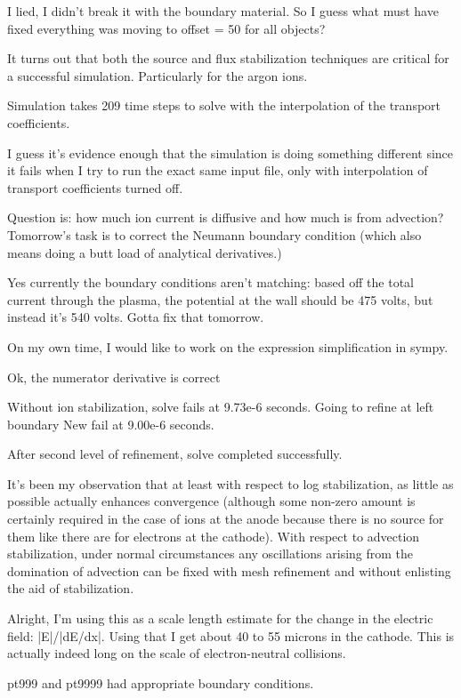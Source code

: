 {I lied, I didn't break it with the boundary material. So I guess what must have fixed everything was moving to offset = 50 for all objects?

It turns out that both the source and flux stabilization techniques are critical for a successful simulation. Particularly for the argon ions.

Simulation takes 209 time steps to solve with the interpolation of the transport coefficients.

I guess it's evidence enough that the simulation is doing something different since it fails when I try to run the exact same input file, only with interpolation of transport coefficients turned off.

Question is: how much ion current is diffusive and how much is from advection? Tomorrow's task is to correct the Neumann boundary condition (which also means doing a butt load of analytical derivatives.)

Yes currently the boundary conditions aren't matching: based off the total current through the plasma, the potential at the wall should be 475 volts, but instead it's 540 volts. Gotta fix that tomorrow.

On my own time, I would like to work on the expression simplification in sympy.

Ok, the numerator derivative is correct

Without ion stabilization, solve fails at 9.73e-6 seconds. Going to refine at left boundary
New fail at 9.00e-6 seconds.

After second level of refinement, solve completed successfully.

It's been my observation that at least with respect to log stabilization, as little as possible actually enhances convergence (although some non-zero amount is certainly required in the case of ions at the anode because there is no source for them like there are for electrons at the cathode). With respect to advection stabilization, under normal circumstances any oscillations arising from the domination of advection can be fixed with mesh refinement and without enlisting the aid of stabilization.

Alright, I'm using this as a scale length estimate for the change in the electric field: |E|/|dE/dx|. Using that I get about 40 to 55 microns in the cathode. This is actually indeed long on the scale of electron-neutral collisions.

pt999 and pt9999 had appropriate boundary conditions.

}
